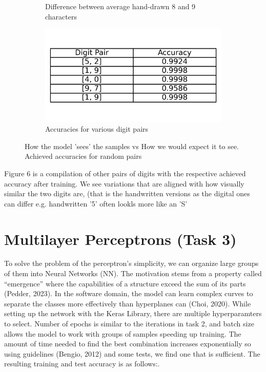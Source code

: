 \documentclass{article}
\begin{document}
\begin{figure}[h!]
\begin{subfigure}[t]{0.3\textwidth}
        \caption{Difference between average hand-drawn 8 and 9 characters}
        \label{fig:plot7b}
    \end{subfigure}
    \hspace{0.01\textwidth}
    \begin{subfigure}[t]{0.3\textwidth}
        \centering
        \includegraphics[width=\textwidth]{./plots/plot8.png} %
        \caption{Accuracies for various digit pairs}
        \label{fig:plot7c}
    \end{subfigure}
    \caption{How the model 'sees' the samples vs How we would expect it to see. Achieved accuracies for random pairs}
    \label{fig:main_figure}
\end{figure}

Figure 6 is a compilation of other pairs of digits with the respective achieved accuracy after training.
We see variations that are aligned with how visually similar the two digits are, (that is the handwritten versions as the digital ones can differ e.g. handwritten '5' often lookls more like an 'S'

\section{Multilayer Perceptrons (Task 3)}

To solve the problem of the perceptron’s simplicity, we can organize large groups of them into Neural Networks (NN).
The motivation stems from a property called “emergence” where the capabilities of a structure exceed the sum of its parts (Pedder, 2023).
In the software domain, the model can learn complex curves to separate the classes more effectively than hyperplanes can (Choi, 2020).
While setting up the network with the Keras Library, there are multiple hyperparamters to select. 
Number of epochs is similar to the iterations in task 2, and batch size allows the model to work with groups of samples speeding up training.
The amount of time needed to find the best combination increases exponentially so using guidelines (Bengio, 2012) and some tests, we find one that is sufficient.
The resulting training and test accuracy is as follows:.
\end{document}
